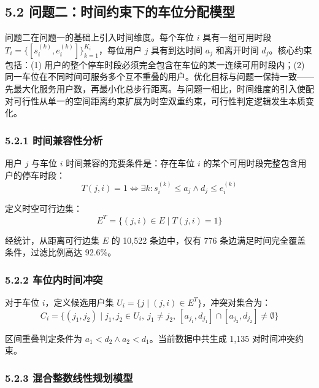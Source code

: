 \documentclass{ctexart}
\begin{document}
\subsection*{5.2 问题二：时间约束下的车位分配模型}

问题二在问题一的基础上引入时间维度。每个车位 $i$ 具有一组可用时段 $T_i = \{[s_i^{(k)}, e_i^{(k)}]\}_{k=1}^{K_i}$，每位用户 $j$ 具有到达时间 $a_j$ 和离开时间 $d_j$。核心约束包括：(1) 用户的整个停车时段必须完全包含在车位的某一连续可用时段内；(2) 同一车位在不同时间可服务多个互不重叠的用户。优化目标与问题一保持一致——先最大化服务用户数，再最小化总步行距离。与问题一相比，时间维度的引入使配对可行性从单一的空间距离约束扩展为时空双重约束，可行性判定逻辑发生本质变化。

\subsubsection*{5.2.1 时间兼容性分析}

用户 $j$ 与车位 $i$ 时间兼容的充要条件是：存在车位 $i$ 的某个可用时段完整包含用户的停车时段：
\begin{equation}
  T(j,i) = 1 \iff \exists k: s_i^{(k)} \le a_j \wedge d_j \le e_i^{(k)} \label{eq:time_compat}
\end{equation}

定义时空可行边集：
\begin{equation}
  E^T = \{(j,i)\in E \mid T(j,i) = 1\} \label{eq:time_edge}
\end{equation}

经统计，从距离可行边集 $E$ 的 10,522 条边中，仅有 776 条边满足时间完全覆盖条件，过滤比例高达 92.6\%。

\subsubsection*{5.2.2 车位内时间冲突}

对于车位 $i$，定义候选用户集 $U_i = \{j \mid (j,i)\in E^T\}$，冲突对集合为：
\begin{equation}
  C_i = \{(j_1,j_2) \mid j_1,j_2\in U_i,\ j_1\neq j_2,\ [a_{j_1},d_{j_1}]\cap [a_{j_2},d_{j_2}]\neq \emptyset\} \label{eq:conflict}
\end{equation}

区间重叠判定条件为 $a_1 < d_2 \wedge a_2 < d_1$。当前数据中共生成 1,135 对时间冲突约束。

\subsubsection*{5.2.3 混合整数线性规划模型}
\end{document}
